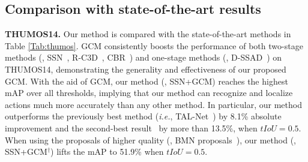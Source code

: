 \documentclass[10pt,journal,compsoc]{IEEEtran}
\begin{document}
	
	
	
	\subsection{Comparison with state-of-the-art results}
	\noindent \textbf{THUMOS14.}
	Our method is compared with the state-of-the-art methods in Table \ref{Tab:thumos}. GCM consistently boosts the performance of both two-stage methods (\eg, SSN~\cite{zhao2017temporal}, R-C3D~\cite{xu2017r}, CBR~\cite{gao2017cascaded}) and one-stage methods (\eg, D-SSAD~\cite{huang2019decoupling}) on THUMOS14, demonstrating the generality and effectiveness of our proposed GCM. With the aid of GCM, our method (\ie, SSN+GCM) reaches the highest mAP over all thresholds, implying that our method can recognize and localize actions much more accurately than any other method. 
	In particular, our method outperforms the previously best method (\emph{i.e.}, TAL-Net~\cite{chao2018rethinking}) by 8.1\% absolute improvement and the second-best result~\cite{gleason2019proposal} by more than 13.5\%, when $tIoU=0.5$. When using the proposals of higher quality (\ie, BMN proposals~\cite{lin2019bmn}), our method (\ie, SSN+GCM${}^\dagger$) lifts the mAP to 51.9\% when $tIoU=0.5$.
	
\end{document}
